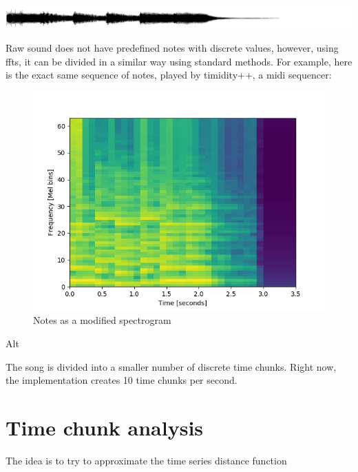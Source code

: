 \documentclass{article}
\begin{document}
\includegraphics[scale=0.5]{mary_good_waveform.png}


Raw sound does not have predefined notes with discrete values, however, using ffts, it can be divided in a similar way using standard methods. For example, here is the exact same sequence of notes, played by timidity++, a midi sequencer:

\begin{figure}
	\caption{Notes as a modified spectrogram}
	\includegraphics[scale=0.8]{mary_start_plot.png}
\end{figure}

Alt

The song is divided into a smaller number of discrete time chunks. Right now, the implementation creates 10 time chunks per second. 


\section{Time chunk analysis}

The idea is to try to approximate the time series distance function 



%
%
%
\end{document}
